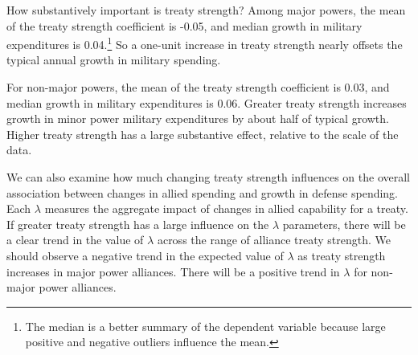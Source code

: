 \documentclass[12pt]{article}
\begin{document}
How substantively important is treaty strength? 
Among major powers, the mean of the treaty strength coefficient is -0.05, and median growth in military expenditures is 0.04.\footnote{The median is a better summary of the dependent variable because large positive and negative outliers influence the mean.} 
So a one-unit increase in treaty strength nearly offsets the typical annual growth in military spending. 


For non-major powers, the mean of the treaty strength coefficient is 0.03, and median growth in military expenditures is 0.06. 
Greater treaty strength increases growth in minor power military expenditures by about half of typical growth. 
Higher treaty strength has a large substantive effect, relative to the scale of the data. 


We can also examine how much changing treaty strength influences on the overall association between changes in allied spending and growth in defense spending. 
Each $\lambda$ measures the aggregate impact of changes in allied capability for a treaty. 
If greater treaty strength has a large influence on the $\lambda$ parameters, there will be a clear trend in the value of $\lambda$ across the range of alliance treaty strength.
We should observe a negative trend in the expected value of $\lambda$ as treaty strength increases in major power alliances. 
There will be a positive trend in $\lambda$ for non-major power alliances. 
\end{document}
